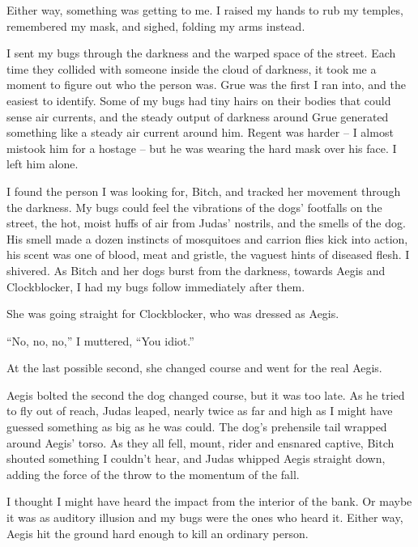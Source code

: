 Either way, something was getting to me.  I raised my hands to rub my temples, remembered my mask, and sighed, folding my arms instead.



I sent my bugs through the darkness and the warped space of the street.  Each time they collided with someone inside the cloud of darkness, it took me a moment to figure out who the person was.  Grue was the first I ran into, and the easiest to identify.  Some of my bugs had tiny hairs on their bodies that could sense air currents, and the steady output of darkness around Grue generated something like a steady air current around him.  Regent was harder – I almost mistook him for a hostage – but he was wearing the hard mask over his face.  I left him alone.



I found the person I was looking for, Bitch, and tracked her movement through the darkness.  My bugs could feel the vibrations of the dogs' footfalls on the street, the hot, moist huffs of air from Judas' nostrils, and the smells of the dog.  His smell made a dozen instincts of mosquitoes and carrion flies kick into action, his scent was one of blood, meat and gristle, the vaguest hints of diseased flesh.  I shivered.  As Bitch and her dogs burst from the darkness, towards Aegis and Clockblocker, I had my bugs follow immediately after them.



She was going straight for Clockblocker, who was dressed as Aegis.



``No, no, no,'' I muttered, ``You idiot.''



At the last possible second, she changed course and went for the real Aegis.



Aegis bolted the second the dog changed course, but it was too late.  As he tried to fly out of reach, Judas leaped, nearly twice as far and high as I might have guessed something as big as he was could.  The dog's prehensile tail wrapped around Aegis' torso.  As they all fell, mount, rider and ensnared captive, Bitch shouted something I couldn't hear, and Judas whipped Aegis straight down, adding the force of the throw to the momentum of the fall.



I thought I might have heard the impact from the interior of the bank.  Or maybe it was as auditory illusion and my bugs were the ones who heard it.  Either way, Aegis hit the ground hard enough to kill an ordinary person.



